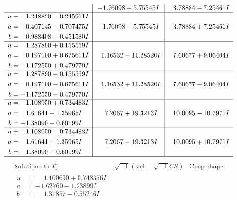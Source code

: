 \documentclass[1p]{elsarticle_modified}
\theoremstyle{definition}
\newcommand{\I}{\sqrt{-1}}
\begin{document}
$$\begin{array}{c|c|c}
 & -1.76098 + 5.75545 I & \phantom{-}3.78884 - 7.25461 I \\ \hline\begin{aligned}
u &= -1.248820 - 0.245961 I \\
a &= -0.407145 - 0.707475 I \\
b &= \phantom{-}0.988408 - 0.451580 I\end{aligned}
 & -1.76098 - 5.75545 I & \phantom{-}3.78884 + 7.25461 I \\ \hline\begin{aligned}
u &= \phantom{-}1.287890 + 0.155559 I \\
a &= \phantom{-}0.197100 + 0.675611 I \\
b &= -1.172550 + 0.479770 I\end{aligned}
 & \phantom{-}1.16532 - 11.28520 I & \phantom{-}7.60677 + 9.06404 I \\ \hline\begin{aligned}
u &= \phantom{-}1.287890 - 0.155559 I \\
a &= \phantom{-}0.197100 - 0.675611 I \\
b &= -1.172550 - 0.479770 I\end{aligned}
 & \phantom{-}1.16532 + 11.28520 I & \phantom{-}7.60677 - 9.06404 I \\ \hline\begin{aligned}
u &= -1.108950 + 0.734483 I \\
a &= \phantom{-}1.61641 - 1.35965 I \\
b &= -1.38090 - 0.60199 I\end{aligned}
 & \phantom{-}7.2067 + 19.3213 I & \phantom{-}10.0095 - 10.7971 I \\ \hline\begin{aligned}
u &= -1.108950 - 0.734483 I \\
a &= \phantom{-}1.61641 + 1.35965 I \\
b &= -1.38090 + 0.60199 I\end{aligned}
 & \phantom{-}7.2067 - 19.3213 I & \phantom{-}10.0095 + 10.7971 I\\
 \hline 
 \end{array}$$\newpage$$\begin{array}{c|c|c}  
\text{Solutions to }I^u_{1}& \I (\text{vol} + \sqrt{-1}CS) & \text{Cusp shape}\\
 \hline 
\begin{aligned}
u &= \phantom{-}1.100690 + 0.748356 I \\
a &= -1.62760 - 1.23899 I \\
b &= \phantom{-}1.31857 - 0.55246 I\end{aligned}

\end{array}$$
\end{document}
